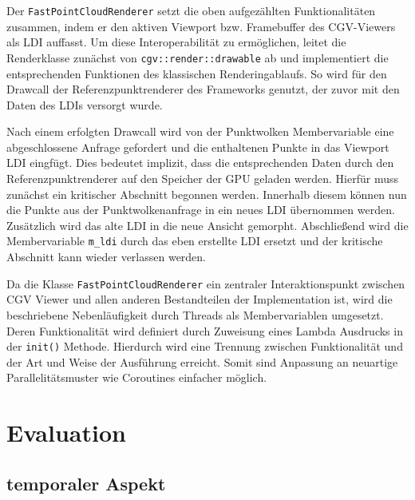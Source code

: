 \documentclass[hyperref, beleg, german]{cgvpub}
\begin{document}
Der \texttt{FastPointCloudRenderer} setzt die oben aufgezählten
Funktionalitäten zusammen, indem er den aktiven Viewport bzw. Framebuffer des
CGV-Viewers als LDI auffasst. Um diese Interoperabilität zu ermöglichen, leitet
die Renderklasse zunächst von \texttt{cgv::render::drawable} ab und
implementiert die entsprechenden Funktionen des klassischen Renderingablaufs.
So wird für den Drawcall der Referenzpunktrenderer des Frameworks genutzt, der
zuvor mit den Daten des LDIs versorgt wurde.

Nach einem erfolgten Drawcall wird von der Punktwolken Membervariable eine
abgeschlossene Anfrage gefordert und die enthaltenen Punkte in das Viewport LDI
eingfügt. Dies bedeutet implizit, dass die entsprechenden Daten durch den
Referenzpunktrenderer auf den Speicher der GPU geladen werden. Hierfür muss
zunächst ein kritischer Abschnitt begonnen werden. Innerhalb diesem können nun
die Punkte aus der Punktwolkenanfrage in ein neues LDI übernommen werden.
Zusätzlich wird das alte LDI in die neue Ansicht gemorpht. Abschließend wird die
Membervariable \texttt{m\_ldi} durch das eben erstellte LDI ersetzt und der
kritische Abschnitt kann wieder verlassen werden.

Da die Klasse \texttt{FastPointCloudRenderer} ein zentraler Interaktionspunkt
zwischen CGV Viewer und allen anderen Bestandteilen der Implementation ist, wird
die beschriebene Nebenläufigkeit durch Threads als Membervariablen umgesetzt.
Deren Funktionalität wird definiert durch Zuweisung eines Lambda Ausdrucks in
der \texttt{init()} Methode. Hierdurch wird eine Trennung zwischen
Funktionalität und der Art und Weise der Ausführung erreicht. Somit sind
Anpassung an neuartige Parallelitätsmuster wie Coroutines einfacher möglich.

\chapter{Evaluation}

\section{temporaler Aspekt}
\end{document}
